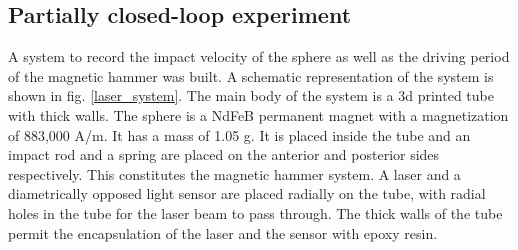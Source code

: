 \documentclass[letterpaper, 10 pt, journal, twoside]{ieeetran}
\begin{document}
\begin{table}[]
\centering
\caption{Properties of the coils used in the magnetic test bench}
\label{coil_table}
\vspace{-1.5em}
\end{table}


\subsection{Partially closed-loop experiment}
\label{partialCLexp}
A system to record the impact velocity of the sphere as well as the driving period of the magnetic hammer was built. A schematic representation of the system is shown in fig. \ref{laser_system}. The main body of the system is a 3d printed tube with thick walls. The sphere is a NdFeB permanent magnet with a magnetization of 883,000 A/m. It has a mass of 1.05 g. It is placed inside the tube and an impact rod and a spring are placed on the anterior and posterior sides respectively. This constitutes the magnetic hammer system. A laser and a diametrically opposed light sensor are placed radially on the tube, with radial holes in the tube for the laser beam to pass through. The thick walls of the tube permit the encapsulation of the laser and the sensor with epoxy resin.\par
\end{document}
